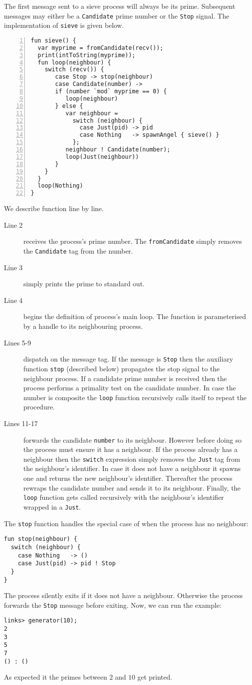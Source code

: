 \documentclass[12pt,mscres,cdtppar,twoside,openright,logo,rightchapter,normalheadings]{infthesis}
\theoremstyle{definition}
\begin{document}
The first message sent to a sieve process will always be its
prime. Subsequent messages may either be a \lstinline$Candidate$ prime
number or the \lstinline$Stop$ signal. The implementation of
\lstinline$sieve$ is given below.
%
\begin{lstlisting}[numbers=left]
fun sieve() {
  var myprime = fromCandidate(recv());
  print(intToString(myprime));
  fun loop(neighbour) {
    switch (recv()) {
       case Stop -> stop(neighbour)
       case Candidate(number) ->
       if (number `mod` myprime == 0) {
          loop(neighbour)
       } else {
          var neighbour =
            switch (neighbour) {
              case Just(pid) -> pid
              case Nothing   -> spawnAngel { sieve() }
            };
          neighbour ! Candidate(number);
          loop(Just(neighbour))
       }
    }
  }
  loop(Nothing)
}
\end{lstlisting}
%
We describe function line by line.
\begin{description}
\item[Line 2] receives the process's prime number. The
  \lstinline$fromCandidate$ simply removes the \lstinline$Candidate$
  tag from the number.
\item[Line 3] simply prints the prime to standard out.
\item[Line 4] begins the definition of process's main loop. The
  function is parameterised by a handle to its neighbouring process.
\item[Lines 5-9] dispatch on the message tag. If the message is
  \lstinline$Stop$ then the auxiliary function \lstinline$stop$
  (described below) propagates the stop signal to the neighbour
  process. If a candidate prime number is received then the process
  performs a primality test on the candidate number. In case the
  number is composite the \lstinline$loop$ function recursively calls
  itself to repeat the procedure.
\item[Lines 11-17] forwards the candidate \lstinline$number$ to its
  neighbour. However before doing so the process must ensure it has a
  neighbour. If the process already has a neighbour then the
  \lstinline$switch$ expression simply removes the \lstinline$Just$
  tag from the neighbour's identifier. In case it does not have a
  neighbour it spawns one and returns the new neighbour's identifier.
  Thereafter the process rewraps the candidate number and sends it to
  its neighbour. Finally, the \lstinline$loop$ function gets called
  recursively with the neighbour's identifier wrapped in a
  \lstinline$Just$.
\end{description}
%
The \lstinline$stop$ function handles the special case of when the
process has no neighbour:
%
\begin{lstlisting}
fun stop(neighbour) {
  switch (neighbour) {
    case Nothing   -> ()
    case Just(pid) -> pid ! Stop
  }
}
\end{lstlisting}
%
The process silently exits if it does not have a neighbour. Otherwise
the process forwards the \lstinline$Stop$ message before exiting. Now,
we can run the example:
\begin{lstlisting}
links> generator(10);
2
3
5
7
() : ()
\end{lstlisting}
%
As expected it the primes between $2$ and $10$ get printed.
\end{document}
